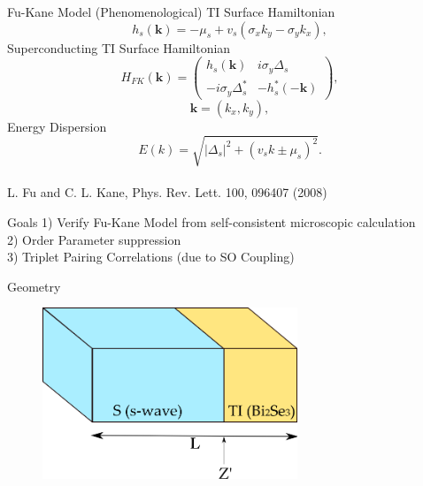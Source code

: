 \documentclass[]{beamer}
\begin{document}
\begin{frame}{Fu-Kane Model (Phenomenological)}
TI Surface Hamiltonian
\begin{equation*}
h_s(\mathbf{k})=-\mu_s + v_s (\sigma_xk_y-\sigma_y k_x),
\end{equation*}
Superconducting TI Surface Hamiltonian
\begin{equation*}
H_{FK}(\mathbf{k})=\left(
\begin{array}{cc}
h_s(\mathbf{k})  &  i\sigma_y  \Delta_s \\
-i\sigma_y \Delta_s^*  &   -h_s^*(-\mathbf{k})
\end{array}\label{fkmodel}
\right),
\end{equation*}
\begin{equation*}
 \mathbf{k}=(k_x,k_y),
\end{equation*}
Energy Dispersion
\begin{equation*}
E(k)=\sqrt{|\Delta_s|^2+(v_sk \pm\mu_s)^2}.
\end{equation*}
 \\
L. Fu and C. L. Kane, Phys. Rev. Lett. 100, 096407 (2008)
\end{frame}


\begin{frame}{Goals}
\Large
1) Verify Fu-Kane Model from self-consistent microscopic calculation\\
2) Order Parameter suppression\\
3) Triplet Pairing Correlations (due to SO Coupling) \\
\end{frame}



\begin{frame}{Geometry} 
\begin{figure}
\includegraphics[width=3in]{include/block.png}\\
\end{figure}
\end{frame}
\end{document}
